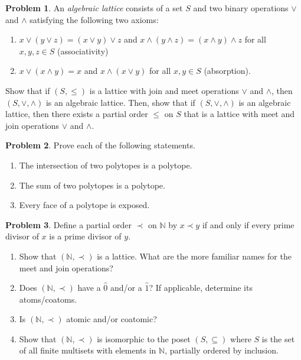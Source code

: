 \documentclass[letterpaper,11pt]{amsart}
\theoremstyle{plain}
\theoremstyle{definition}
\newtheorem{pr}{Problem}
\theoremstyle{remark}
\begin{document}
\begin{pr}\label{pr: algebraic definition of lattice}
    An \emph{algebraic lattice} consists of a set $S$ and two binary operations $\vee$ and $\wedge$ satisfying the following two axioms:
    \begin{enumerate}
        \item $x \vee (y \vee z) = (x \vee y) \vee z$ and $x \wedge (y \wedge z) = (x \wedge y) \wedge z$ for all $x,y,z \in S$ (associativity)
        \item $x \vee (x \wedge y) = x$ and $x \wedge (x \vee y)$ for all $x, y \in S$ (absorption).
    \end{enumerate}
    Show that if $(S,\le)$ is a lattice with join and meet operations $\vee$ and $\wedge$, then $(S,\vee,\wedge)$ is an algebraic lattice.
    Then, show that if $(S,\vee,\wedge)$ is an algebraic lattice,
    then there exists a partial order $\le$ on $S$ that is a lattice with meet and join operations $\vee$ and $\wedge$.
\end{pr}

\bigskip


\bigskip

\begin{pr}
    Prove each of the following statements. 
    \begin{enumerate}
        \item The intersection of two polytopes is a polytope.
        \item The sum of two polytopes is a polytope.
        \item Every face of a polytope is exposed.
    \end{enumerate}
\end{pr}


\begin{pr}\label{pr: divisor lattice}
    Define a partial order $\prec$ on $\mathbb{N}$ by $x \prec y$ if and only if every prime divisor of $x$ is a prime divisor of $y$.
    \begin{enumerate}
        \item Show that $(\mathbb{N},\prec)$ is a lattice. What are the more familiar names for the meet and join operations?
        \item Does $(\mathbb{N},\prec)$ have a $\hat{0}$ and/or a $\hat{1}$? If applicable, determine its atoms/coatoms.
        \item Is $(\mathbb{N},\prec)$ atomic and/or coatomic?
        \item Show that $(\mathbb{N},\prec)$ is isomorphic to the poset $(S,\subseteq)$ where $S$ is the set of all finite multisets with elements in $\mathbb{N}$, partially ordered by inclusion.
    \end{enumerate}
\end{pr}
\end{document}
